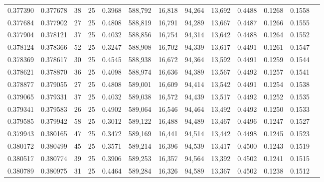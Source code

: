 \begin{tabular}{rrrrrrrrrrrrr}
0.377390 & 0.377678 &    38 &  25 &                                     0.3968 & 588,792 &  16,818 &  94,264 &  13,692 & 0.4488 & 0.1268 & 0.1558 \\
0.377684 & 0.377902 &    27 &  25 &                                     0.4808 & 588,819 &  16,791 &  94,289 &  13,667 & 0.4487 & 0.1266 & 0.1555 \\
0.377904 & 0.378121 &    37 &  25 &                                     0.4032 & 588,856 &  16,754 &  94,314 &  13,642 & 0.4488 & 0.1264 & 0.1552 \\
0.378124 & 0.378366 &    52 &  25 &                                     0.3247 & 588,908 &  16,702 &  94,339 &  13,617 & 0.4491 & 0.1261 & 0.1547 \\
0.378369 & 0.378617 &    30 &  25 &                                     0.4545 & 588,938 &  16,672 &  94,364 &  13,592 & 0.4491 & 0.1259 & 0.1544 \\
0.378621 & 0.378870 &    36 &  25 &                                     0.4098 & 588,974 &  16,636 &  94,389 &  13,567 & 0.4492 & 0.1257 & 0.1541 \\
0.378877 & 0.379055 &    27 &  25 &                                     0.4808 & 589,001 &  16,609 &  94,414 &  13,542 & 0.4491 & 0.1254 & 0.1538 \\
0.379065 & 0.379331 &    37 &  25 &                                     0.4032 & 589,038 &  16,572 &  94,439 &  13,517 & 0.4492 & 0.1252 & 0.1535 \\
0.379341 & 0.379583 &    26 &  25 &                                     0.4902 & 589,064 &  16,546 &  94,464 &  13,492 & 0.4492 & 0.1250 & 0.1533 \\
0.379585 & 0.379942 &    58 &  25 &                                     0.3012 & 589,122 &  16,488 &  94,489 &  13,467 & 0.4496 & 0.1247 & 0.1527 \\
0.379943 & 0.380165 &    47 &  25 &                                     0.3472 & 589,169 &  16,441 &  94,514 &  13,442 & 0.4498 & 0.1245 & 0.1523 \\
0.380172 & 0.380499 &    45 &  25 &                                     0.3571 & 589,214 &  16,396 &  94,539 &  13,417 & 0.4500 & 0.1243 & 0.1519 \\
0.380517 & 0.380774 &    39 &  25 &                                     0.3906 & 589,253 &  16,357 &  94,564 &  13,392 & 0.4502 & 0.1241 & 0.1515 \\
0.380789 & 0.380975 &    31 &  25 &                                     0.4464 & 589,284 &  16,326 &  94,589 &  13,367 & 0.4502 & 0.1238 & 0.1512 \\

\end{tabular}
